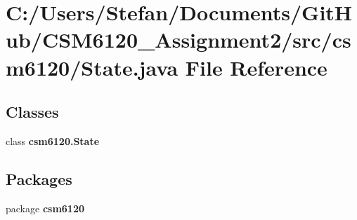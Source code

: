 \section{C\+:/\+Users/\+Stefan/\+Documents/\+Git\+Hub/\+C\+S\+M6120\+\_\+\+Assignment2/src/csm6120/\+State.java File Reference}
\label{_state_8java}
\subsection*{Classes}
\begin{DoxyCompactItemize}
\item 
class {\bf csm6120.\+State}
\end{DoxyCompactItemize}
\subsection*{Packages}
\begin{DoxyCompactItemize}
\item 
package {\bf csm6120}
\end{DoxyCompactItemize}
